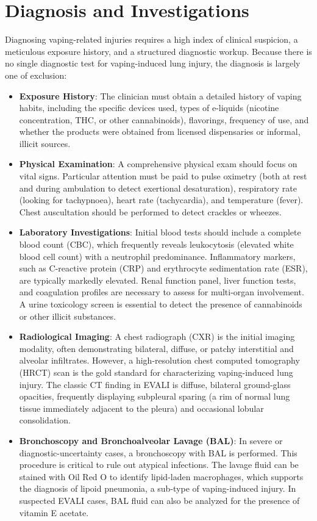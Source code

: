 \section*{Diagnosis and Investigations}
Diagnosing vaping-related injuries requires a high index of clinical suspicion, a meticulous exposure history, and a structured diagnostic workup. Because there is no single diagnostic test for vaping-induced lung injury, the diagnosis is largely one of exclusion:
\begin{itemize}
    \item \textbf{Exposure History}: The clinician must obtain a detailed history of vaping habits, including the specific devices used, types of e-liquids (nicotine concentration, THC, or other cannabinoids), flavorings, frequency of use, and whether the products were obtained from licensed dispensaries or informal, illicit sources.
    \item \textbf{Physical Examination}: A comprehensive physical exam should focus on vital signs. Particular attention must be paid to pulse oximetry (both at rest and during ambulation to detect exertional desaturation), respiratory rate (looking for tachypnoea), heart rate (tachycardia), and temperature (fever). Chest auscultation should be performed to detect crackles or wheezes.
    \item \textbf{Laboratory Investigations}: Initial blood tests should include a complete blood count (CBC), which frequently reveals leukocytosis (elevated white blood cell count) with a neutrophil predominance. Inflammatory markers, such as C-reactive protein (CRP) and erythrocyte sedimentation rate (ESR), are typically markedly elevated. Renal function panel, liver function tests, and coagulation profiles are necessary to assess for multi-organ involvement. A urine toxicology screen is essential to detect the presence of cannabinoids or other illicit substances.
    \item \textbf{Radiological Imaging}: A chest radiograph (CXR) is the initial imaging modality, often demonstrating bilateral, diffuse, or patchy interstitial and alveolar infiltrates. However, a high-resolution chest computed tomography (HRCT) scan is the gold standard for characterizing vaping-induced lung injury. The classic CT finding in EVALI is diffuse, bilateral ground-glass opacities, frequently displaying subpleural sparing (a rim of normal lung tissue immediately adjacent to the pleura) and occasional lobular consolidation.
    \item \textbf{Bronchoscopy and Bronchoalveolar Lavage (BAL)}: In severe or diagnostic-uncertainty cases, a bronchoscopy with BAL is performed. This procedure is critical to rule out atypical infections. The lavage fluid can be stained with Oil Red O to identify lipid-laden macrophages, which supports the diagnosis of lipoid pneumonia, a sub-type of vaping-induced injury. In suspected EVALI cases, BAL fluid can also be analyzed for the presence of vitamin E acetate.
\end{itemize}

